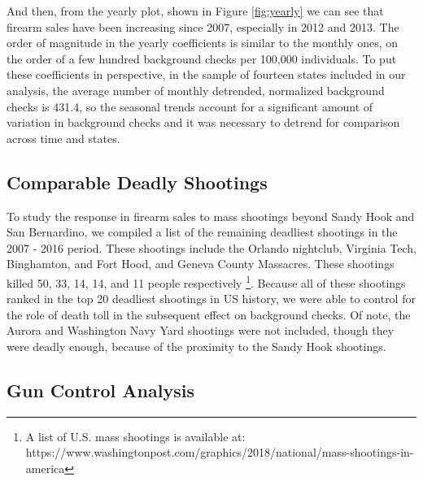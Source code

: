 \documentclass[9pt,twocolumn,twoside,lineno]{pnas-new}
\begin{document}
    And then, from the yearly plot, shown in Figure \ref{fig:yearly} we can see that firearm sales have been increasing since 2007, especially in 2012 and 2013. The order of magnitude in the yearly coefficients is similar to the monthly ones, on the order of a few hundred background checks per 100,000 individuals. To put these coefficients in perspective, in the sample of fourteen states included in our analysis, the average number of monthly detrended, normalized background checks is 431.4, so the seasonal trends account for a significant amount of variation in background checks and it was necessary to detrend for comparison across time and states. 
    
\subsection*{Comparable Deadly Shootings}

	To study the response in firearm sales to mass shootings beyond Sandy Hook and San Bernardino, we compiled a list of the remaining deadliest shootings in the 2007 - 2016 period. These shootings include the Orlando nightclub, Virginia Tech, Binghamton, and Fort Hood, and Geneva County Massacres. These shootings killed 50, 33, 14, 14, and 11 people respectively \footnote{A list of U.S. mass shootings is available at: https://www.washingtonpost.com/graphics/2018/national/mass-shootings-in-america}. Because all of these shootings ranked in the top 20 deadliest shootings in US history, we were able to control for the role of death toll in the subsequent effect on background checks. 
	Of note, the Aurora and Washington Navy Yard shootings were not included, though they were deadly enough, because of the proximity to the Sandy Hook shootings. 
    
\subsection*{Gun Control Analysis}
\end{document}
